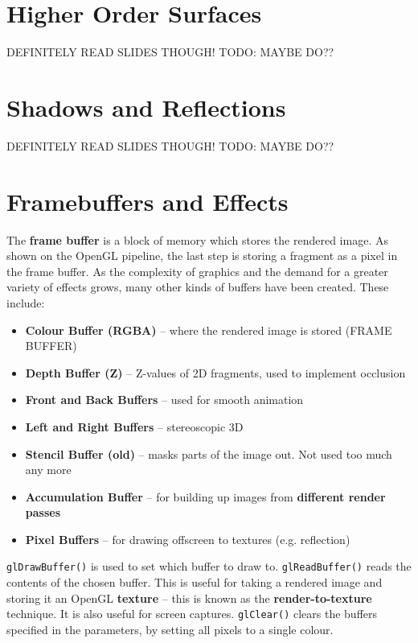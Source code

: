 \documentclass{article}
\begin{document}
\section{Higher Order Surfaces}

DEFINITELY READ SLIDES THOUGH!
TODO: MAYBE DO??

\section{Shadows and Reflections}

DEFINITELY READ SLIDES THOUGH!
TODO: MAYBE DO??

\section{Framebuffers and Effects}

The \textbf{frame buffer} is a block of memory which stores the rendered image. As shown on the OpenGL pipeline, the last step is storing a fragment as a pixel in the frame buffer. As the complexity of graphics and the demand for a greater variety of effects grows, many other kinds of buffers have been created. These include:
\begin{itemize}
	\item \textbf{Colour Buffer (RGBA)} -- where the rendered image is stored (FRAME BUFFER)
	\item \textbf{Depth Buffer (Z)} -- Z-values of 2D fragments, used to implement occlusion
	\item \textbf{Front and Back Buffers} -- used for smooth animation
	\item \textbf{Left and Right Buffers} -- stereoscopic 3D
	\item \textbf{Stencil Buffer (old)} -- masks parts of the image out. Not used too much any more
	\item \textbf{Accumulation Buffer} -- for building up images from \textbf{different render passes}
	\item \textbf{Pixel Buffers} -- for drawing offscreen to textures (e.g. reflection)
\end{itemize}

\texttt{glDrawBuffer()} is used to set which buffer to draw to. \texttt{glReadBuffer()} reads the contents of the chosen buffer. This is useful for taking a rendered image and storing it an OpenGL \textbf{texture} -- this is known as the \textbf{render-to-texture} technique. It is also useful for screen captures. \texttt{glClear()} clears the buffers specified in the parameters, by setting all pixels to a single colour.
\end{document}
